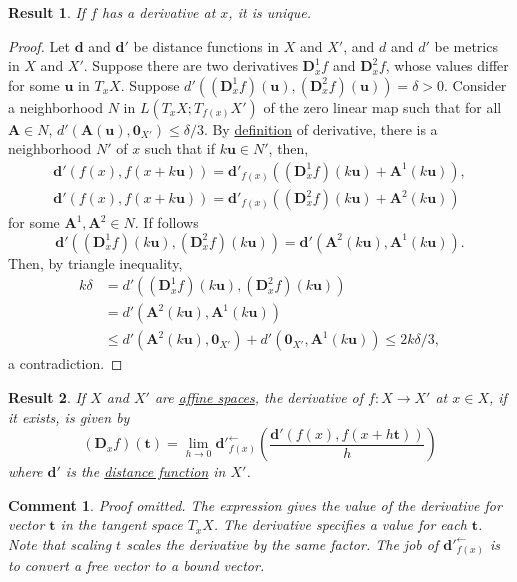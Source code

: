 \documentclass[letterpaper,12pt]{article}
\theoremstyle{plain}
\newtheorem{res}{Result}
\theoremstyle{plain}
\newtheorem*{cmnt*}{Comment}
\theoremstyle{definition}
\begin{document}
\begin{res} If $f$ has a derivative at $x$, it is unique.
\end{res}
\begin{proof} Let $\mathbf{d}$ and $\mathbf{d}'$ be distance functions in $X$ and $X'$, and $d$ and $d'$ be metrics in $X$ and $X'$. Suppose there are two derivatives $\mathbf{D}_x^1f$ and $\mathbf{D}_x^2f$, whose values differ for some $\mathbf{u}$ in $T_xX$. Suppose $d'((\mathbf{D}_x^1f)(\mathbf{u}),(\mathbf{D}_x^2f)(\mathbf{u}))=\delta>0$. Consider a neighborhood $N$ in $L(T_xX;T_{f(x)}X')$ of the zero linear map such that for all $\mathbf{A}\in N$, $d'(\mathbf{A}(\mathbf{u}),\mathbf{0}_{X'}) \le \delta/3$. By \hyperref[defderivat]{definition} of derivative, there is a neighborhood $N'$ of $x$ such that if $k\mathbf{u}\in N'$, then,
\begin{align*}
\mathbf{d}'\left( f(x),f(x+k\mathbf{u})\right) = \mathbf{d}'_{f(x)}\left( (\mathbf{D}_x^1f)(k\mathbf{u})+\mathbf{A}^1(k\mathbf{u})\right),\\
\mathbf{d}'\left( f(x),f(x+k\mathbf{u})\right) = \mathbf{d}'_{f(x)}\left( (\mathbf{D}_x^2f)(k\mathbf{u})+\mathbf{A}^2(k\mathbf{u})\right)
\end{align*}
for some $\mathbf{A}^1,\mathbf{A}^2\in N$. If follows
\[ \mathbf{d}'\left( (\mathbf{D}_x^1f)(k\mathbf{u}), (\mathbf{D}_x^2f)(k\mathbf{u}) \right) = \mathbf{d}'\left( \mathbf{A}^2(k\mathbf{u}), \mathbf{A}^1(k\mathbf{u})\right).\]
Then, by triangle inequality,
\begin{align*}
k\delta &= d'\left( (\mathbf{D}_x^1f)(k\mathbf{u}), (\mathbf{D}_x^2f)(k\mathbf{u}) \right) \\
&= d'\left( \mathbf{A}^2(k\mathbf{u}), \mathbf{A}^1(k\mathbf{u})\right) \\
&\le d'\left( \mathbf{A}^2(k\mathbf{u}), \mathbf{0}_{X'} \right) + d'\left( \mathbf{0}_{X'}, \mathbf{A}^1(k\mathbf{u}) \right) \le 2k\delta/3,
\end{align*}
a contradiction.
\end{proof}

\begin{res} If $X$ and $X'$ are \hyperref[defafsp]{affine spaces}, the derivative of $f:X\rightarrow X'$ at $x\in X$, if it exists, is given by
\[ (\mathbf{D}_xf)(\mathbf{t}) = \lim_{h \to 0} {\mathbf{d}'}_{f(x)}^{\leftarrow} \left( \frac{\mathbf{d}'\left( f(x),f(x+h\mathbf{t}) \right)}{h} \right)\]
where $\mathbf{d}'$ is the \hyperref[defafsp]{distance function} in $X'$.
\end{res}
\begin{cmnt*}
Proof omitted. The expression gives the value of the derivative for vector $\mathbf{t}$ in the tangent space $T_xX$. The derivative specifies a value for each $\mathbf{t}$. Note that scaling $t$ scales the derivative by the same factor. The job of ${\mathbf{d}'}_{f(x)}^{\leftarrow}$ is to convert a free vector to a bound vector.
\end{cmnt*}
\end{document}
